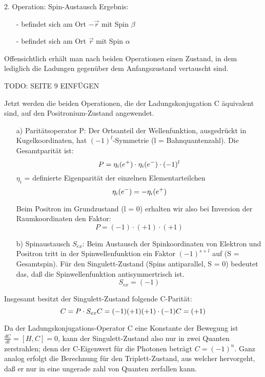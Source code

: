 2. Operation: Spin-Austausch
Ergebnis:
\begin{itemize}
 \item[-] \elektron befindet sich am Ort $-\vec{r}$ mit Spin $\beta$
 \item[-] \positron befindet sich am Ort $\vec{r}$ mit Spin $\alpha$
\end{itemize}
Offensichtlich erhält man nach beiden Operationen einen Zustand, in dem lediglich die Ladungen gegenüber dem Anfangszustand vertauscht sind.

TODO: SEITE 9 EINFÜGEN

Jetzt werden die beiden Operationen, die der Ladungskonjugation C äquivalent sind, auf den Positronium-Zustand angewendet.

\begin{itemize}
 \item[a)] Paritätsoperator P:
Der Ortsanteil der Wellenfunktion, ausgedrückt in Kugelkoordinaten, hat $(-1)^l$-Symmetrie (l = Bahnquantenzahl).
Die Gesamtparität ist:
\begin{equation*}
 P = \eta_i( e^+ ) \cdot \eta_i (e^-) \cdot (-1)^l
\end{equation*}
$\eta_i$ = definierte Eigenparität der einzelnen Elementarteilchen
\begin{equation*}
 \eta_i ( e^- ) = - \eta_i ( e^+ )
\end{equation*}

Beim Positron im Grundzustand (l = 0) erhalten wir also bei Inversion der Raumkoordinaten den Faktor:
\begin{equation*}
 P = (-1) \cdot (+1) \cdot (+1)
\end{equation*}

\item[b)] Spinaustausch $S_{ex}$:
Beim Austausch der Spinkoordinaten von Elektron und Positron tritt in der Spinwellenfunktion ein Faktor $(-1)^{s+l}$ auf (S = Gesamtspin). Für den Singulett-Zustand (Spins antiparallel, S = 0) bedeutet das, daß die Spinwellenfunktion antisymmertrisch ist.
\begin{equation*}
 S_{ex} = (-1)
\end{equation*}
\end{itemize}

Insgesamt besitzt der Singulett-Zustand folgende C-Parität:
\begin{equation*}
 C = P \cdot S_{ex} \\
 C = (-1)(+1)(+1)\cdot(-1) \\
 C = (+1)
\end{equation*} %

Da der Ladungskonjugations-Operator C eine Konstante der Bewegung ist $ \frac{dC}{dt} = [H, C] = 0$, kann der Singulett-Zustand also nur in zwei Quanten zerstrahlen; denn der C-Eigenwert für die Photonen beträgt $C = (-1)^n$. Ganz analog erfolgt die Berechnung für den Triplett-Zustand, aus welcher hervorgeht, daß er nur in eine ungerade zahl von Quanten zerfallen kann.

